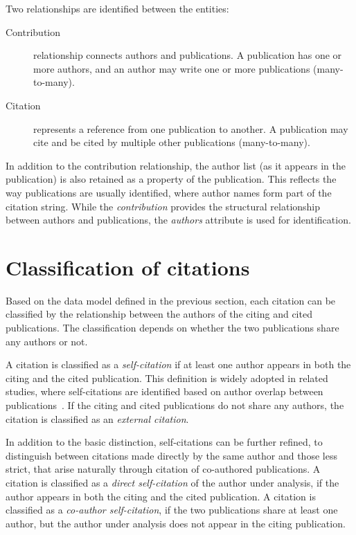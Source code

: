Two relationships are identified between the entities:

\begin{description}

    \item[Contribution] relationship connects authors and publications.
    A publication has one or more authors, and an author may write one or more publications (many-to-many).

    \item[Citation] represents a reference from one publication to another.
    A publication may cite and be cited by multiple other publications (many-to-many).

\end{description}

In addition to the contribution relationship, the author list (as it appears in the publication) is also retained as a property of the publication.
This reflects the way publications are usually identified, where author names form part of the citation string.
While the \emph{contribution} provides the structural relationship between authors and publications, the \emph{authors} attribute is used for identification.


\section{Classification of citations} \label{sec:citation-classification}

Based on the data model defined in the previous section, each citation can be classified by the relationship between the authors of the citing and cited publications.
The classification depends on whether the two publications share any authors or not.

A citation is classified as a \emph{self-citation} if at least one author appears in both the citing and the cited publication.
This definition is widely adopted in related studies, where self-citations are identified based on author overlap between publications~\cite{Glnzel2003BIBLIOMETRICSAA, Fowler2007}.
If the citing and cited publications do not share any authors, the citation is classified as an \emph{external citation}.

In addition to the basic distinction, self-citations can be further refined, to distinguish between citations made directly by the same author and those less strict, that arise naturally through citation of co-authored publications.
A citation is classified as a \emph{direct self-citation} of the author under analysis, if the author appears in both the citing and the cited publication.
A citation is classified as a \emph{co-author self-citation}, if the two publications share at least one author, but the author under analysis does not appear in the citing publication.

